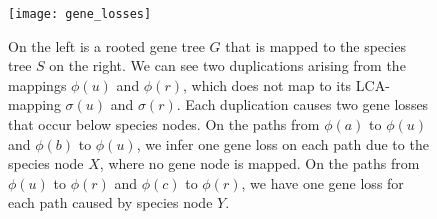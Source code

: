 \begin{figure}[!htbp]
	\centering
  	\texttt{[image: gene\_losses]}
  	\caption[Occurrence of gene losses]
  	{On the left is a rooted gene tree $G$ that is mapped to the species tree $S$ on the right. We can see two duplications arising from the mappings $\phi(u)$ and $\phi(r)$, which does not map to its LCA-mapping $\sigma(u)$ and $\sigma(r)$. Each duplication causes two gene losses that occur below species nodes. On the paths from $\phi(a)$ to $\phi(u)$ and $\phi(b)$ to $\phi(u)$, we infer one gene loss on each path due to the species node $X$, where no gene node is mapped. On the paths from $\phi(u)$ to $\phi(r)$ and $\phi(c)$ to $\phi(r)$, we have one gene loss for each path caused by species node $Y$.}
  	\label{gene_losses}
\end{figure}





